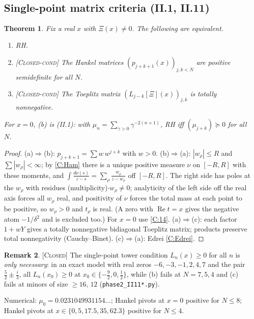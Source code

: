 \documentclass[11pt]{amsart}
\theoremstyle{plain}
\newtheorem{theorem}{Theorem}[section]
\theoremstyle{definition}
\newtheorem{remark}[theorem]{Remark}
\newcommand{\status}[1]{\textsc{[#1]}}
\begin{document}
\subsection{Single-point matrix criteria (II.1, II.11)}
\begin{theorem}\label{thm:single}
Fix a real $x$ with $\Xi(x)\neq0$. The following are equivalent.
\begin{enumerate}[label=(\alph*)]
\item RH.
\item \status{Closed-cond} The Hankel matrices $(p_{j+k+1}(x))_{j,k<N}$ are positive semidefinite for all $N$.
\item \status{Closed-cond} The Toeplitz matrix $(L_{j-k}[\Xi](x))_{j,k}$ is totally nonnegative.
\end{enumerate}
For $x=0$, (b) is (II.1): with $\mu_n=\sum_{\gamma>0}\gamma^{-2(n+1)}$, RH iff $(\mu_{j+k})\succeq0$ for all $N$.
\end{theorem}
\begin{proof}
(a)$\Rightarrow$(b): $p_{j+k+1}=\sum w\,w^{j+k}$ with $w>0$.
(b)$\Rightarrow$(a): $|w_\rho|\le R$ and $\sum|w_\rho|<\infty$; by \ref{C:Ham} there is a
unique positive measure $\nu$ on $[-R,R]$ with these moments, and
$\int\frac{d\nu(s)}{z-s}=\sum_\rho\frac{w_\rho}{z-w_\rho}$ off $[-R,R]$. The right side
has poles at the $w_\rho$ with residues (multiplicity)$\cdot w_\rho\neq0$; analyticity
of the left side off the real axis forces all $w_\rho$ real, and positivity of $\nu$
forces the total mass at each point to be positive, so $w_\rho>0$ and $t_\rho$ is real.
(A zero with $\operatorname{Re}t=x$ gives the negative atom $-1/\delta^2$ and is excluded too.)
For $x=0$ use \ref{C:14}.
(a)$\Rightarrow$(c): each factor $1+wY$ gives a totally nonnegative bidiagonal
Toeplitz matrix; products preserve total nonnegativity (Cauchy--Binet).
(c)$\Rightarrow$(a): Edrei \ref{C:Edrei}.
\end{proof}
\begin{remark}\status{Closed}
The single-point tower condition $L_n(x)\ge0$ for all $n$ is \emph{only necessary}:
in an exact model with real zeros $-6,-3,-1,2,4,7$ and the pair $\frac52\pm\frac i3$,
all $L_n(x_0)\ge0$ at $x_0\in\{-\frac92,0,\frac12\}$, while (b) fails at $N=7,5,4$ and
(c) fails at minors of size $\ge16$, $12$ (\texttt{phase2\_II11*.py}).
\end{remark}
\noindent Numerical: $\mu_0=0.0231049931154\ldots$; Hankel pivots at $x=0$ positive for $N\le8$; Hankel pivots at $x\in\{0,5,17.5,35,62.3\}$ positive for $N\le4$.
\end{document}
